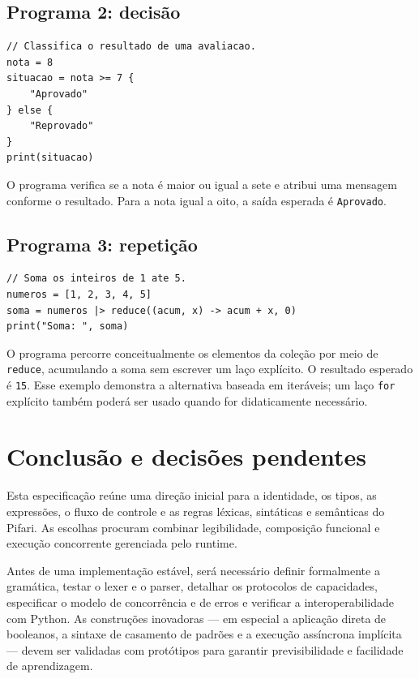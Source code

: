 \documentclass[12pt,a4paper]{article}
\begin{document}
\subsection{Programa 2: decisão}
\begin{lstlisting}
// Classifica o resultado de uma avaliacao.
nota = 8
situacao = nota >= 7 {
    "Aprovado"
} else {
    "Reprovado"
}
print(situacao)
\end{lstlisting}
O programa verifica se a nota é maior ou igual a sete e atribui uma mensagem conforme o resultado. Para a nota igual a oito, a saída esperada é \texttt{Aprovado}.

\subsection{Programa 3: repetição}
\begin{lstlisting}
// Soma os inteiros de 1 ate 5.
numeros = [1, 2, 3, 4, 5]
soma = numeros |> reduce((acum, x) -> acum + x, 0)
print("Soma: ", soma)
\end{lstlisting}
O programa percorre conceitualmente os elementos da coleção por meio de \texttt{reduce}, acumulando a soma sem escrever um laço explícito. O resultado esperado é \texttt{15}. Esse exemplo demonstra a alternativa baseada em iteráveis; um laço \texttt{for} explícito também poderá ser usado quando for didaticamente necessário.

\section{Conclusão e decisões pendentes}
Esta especificação reúne uma direção inicial para a identidade, os tipos, as expressões, o fluxo de controle e as regras léxicas, sintáticas e semânticas do Pifari. As escolhas procuram combinar legibilidade, composição funcional e execução concorrente gerenciada pelo runtime.

Antes de uma implementação estável, será necessário definir formalmente a gramática, testar o lexer e o parser, detalhar os protocolos de capacidades, especificar o modelo de concorrência e de erros e verificar a interoperabilidade com Python. As construções inovadoras — em especial a aplicação direta de booleanos, a sintaxe de casamento de padrões e a execução assíncrona implícita — devem ser validadas com protótipos para garantir previsibilidade e facilidade de aprendizagem.
\end{document}
